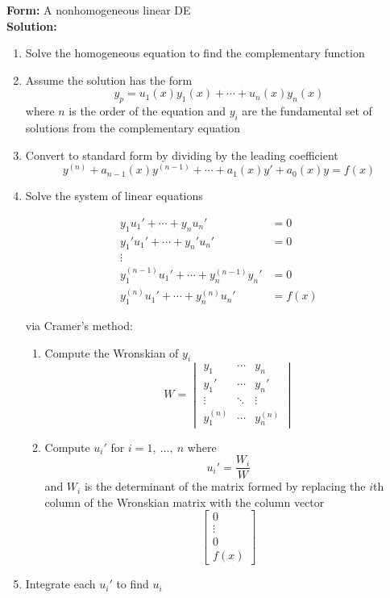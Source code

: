 \documentclass{article}
\begin{document}
\textbf{Form:} A nonhomogeneous linear DE \\ \textbf{Solution:} \begin{enumerate}
  \item Solve the homogeneous equation to find the complementary function

  \item Assume the solution has the form \[y_p = u_1(x) y_1(x) + \cdots + u_n(x) y_n(x)\] where $n$ is the order of the equation and $y_i$ are the fundamental set of solutions from the complementary equation

  \item Convert to standard form by dividing by the leading coefficient \[y^{(n)} + a_{n - 1}(x) y^{(n - 1)} + \cdots + a_1(x) y' + a_0(x) y = f(x)\]

  \item Solve the system of linear equations

        \begin{align*}
          y_1 u_1' + \cdots + y_n u_n'                     & = 0    \\
          y_1' u_1' + \cdots + y_n' u_n'                   & = 0    \\
          \vdots \qquad \qquad                                      \\
          y_1^{(n - 1)} u_1' + \cdots + y_n^{(n - 1)} y_n' & = 0    \\
          y_1^{(n)} u_1' + \cdots + y_n^{(n)} u_n'         & = f(x)
        \end{align*}

        via Cramer's method:

        \begin{enumerate}
          \item Compute the Wronskian of $y_i$ \[W = \begin{vmatrix}
                    y_1       & \cdots & y_n       \\
                    y_1'      & \cdots & y_n'      \\
                    \vdots    & \ddots & \vdots    \\
                    y_1^{(n)} & \cdots & y_n^{(n)}
                  \end{vmatrix}\]

          \item Compute $u_i'$ for $i = 1, \: \ldots, \: n$ where \[u_i' = \frac{W_i}{W}\] and $W_i$ is the determinant of the matrix formed by replacing the $i$th column of the Wronskian matrix with the column vector \[\begin{bmatrix}
                    0      \\
                    \vdots \\
                    0      \\
                    f(x)
                  \end{bmatrix}\]
        \end{enumerate}

  \item Integrate each $u_i'$ to find $u_i$
\end{enumerate}
\end{document}
